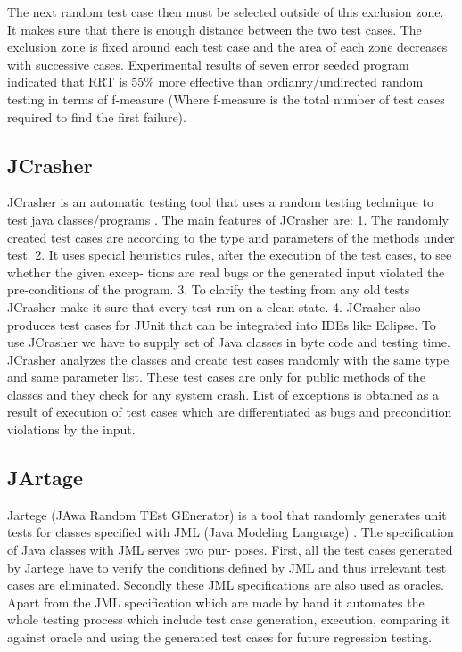 The next random test case then must be selected outside of this exclusion zone. It makes sure that there is enough distance between the two test cases. The exclusion zone is fixed around each test case and the area of each zone decreases with successive cases.
Experimental results of seven error seeded program indicated that RRT is 55\% more effective than ordianry/undirected random testing in terms of f-measure (Where f-measure is the total number of test cases required to find the first failure).


\subsection{JCrasher}
JCrasher is an automatic testing tool that uses a random testing technique to test java classes/programs \cite{Pacheco2007b}. The main features of JCrasher are:
1. The randomly created test cases are according to the type and parameters of the methods under test.
2. It uses special heuristics rules, after the execution of the test cases, to see whether the given excep- tions are real bugs or the generated input violated the pre-conditions of the program.
3. To clarify the testing from any old tests JCrasher make it sure that every test run on a clean state.
4. JCrasher also produces test cases for JUnit that can be integrated into IDEs like Eclipse.
To use JCrasher we have to supply set of Java classes in byte code and testing time. JCrasher analyzes the classes and create test cases randomly with the same type and same parameter list. These test cases are only for public methods of the classes and they check for any system crash. List of exceptions is obtained as a result of execution of test cases which are differentiated as bugs and precondition violations by the input.

\subsection{JArtage}
Jartege (JAwa Random TEst GEnerator) is a tool that randomly generates unit tests for classes specified with JML (Java Modeling Language) \cite{Oriat2004}. The specification of Java classes with JML serves two pur- poses. First, all the test cases generated by Jartege have to verify the conditions defined by JML and thus irrelevant test cases are eliminated. Secondly these JML specifications are also used as oracles. Apart from the JML specification which are made by hand it automates the whole testing process which include test case generation, execution, comparing it against oracle and using the generated test cases for future regression testing.

